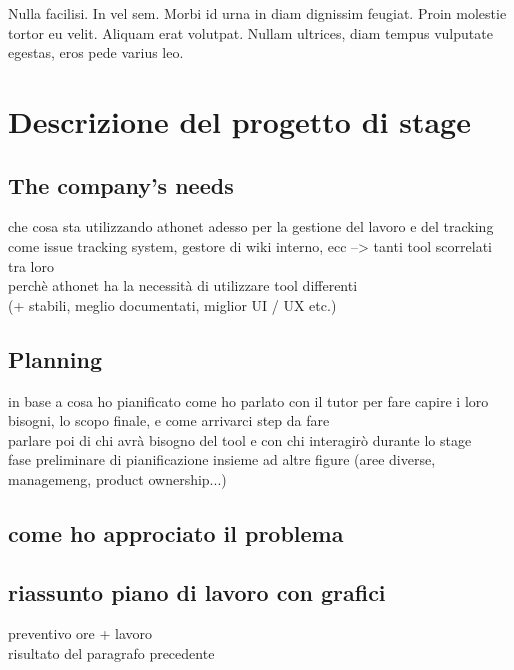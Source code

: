 \begin{savequote}[75mm]
Nulla facilisi. In vel sem. Morbi id urna in diam dignissim feugiat. Proin molestie tortor eu velit. Aliquam erat volutpat. Nullam ultrices, diam tempus vulputate egestas, eros pede varius leo.
\end{savequote}

\chapter{Descrizione del progetto di stage}




\section{The company's needs}
che cosa sta utilizzando athonet adesso per la gestione del lavoro e del tracking\\
come issue tracking system, gestore di wiki interno, ecc --> tanti tool scorrelati tra loro\\
perchè athonet ha la necessità di utilizzare tool differenti \\
(+ stabili, meglio documentati, miglior UI / UX etc.)

\section{Planning}
in base a cosa ho pianificato
come ho parlato con il tutor per fare capire i loro bisogni, lo scopo finale, e come arrivarci
step da fare\\
parlare poi di chi avrà bisogno del tool e con chi interagirò durante lo stage\\
fase preliminare di pianificazione insieme ad altre figure (aree diverse, managemeng, product ownership...)

\section{come ho approciato il problema}

\section{riassunto piano di lavoro con grafici}
preventivo ore + lavoro\\
risultato del paragrafo precedente
